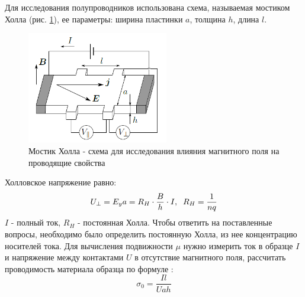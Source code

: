 \documentclass[a4paper,12pt]{article} %
\begin{document}
Для исследования полупроводников использована схема, называемая мостиком Холла (рис. \ref{мостик}), ее параметры: ширина пластинки $a$, толщина $h$,
длина $l$.
\begin{figure}[h!]
\begin{center}
\includegraphics[width=0.55\textwidth]{мостик}
\caption{Мостик Холла - схема для исследования влияния магнитного поля на проводящие свойства} \label{мостик}
\end{center}
\end{figure} 
Холловское напряжение равно:
\begin{equation}
\label{R_H}
U_\perp = E_y a=R_H\cdot \frac{B}{h}\cdot I, \hspace{2mm} R_H=\frac{1}{nq}
\end{equation}
$I$ - полный ток, $R_H$ - постоянная Холла.
Чтобы ответить на поставленные вопросы, необходимо было определить постоянную Холла, из нее концентрацию носителей тока. Для вычисления подвижности $\mu$ нужно измерить ток в образце $I$ и напряжение между контактами $U$ в отсутствие магнитного поля, рассчитать проводимость материала образца по формуле \cite{labnik}:
\begin{equation}
\label{sigma}
\sigma_0 = \frac{Il}{Uah}
\end{equation} 
\end{document}
